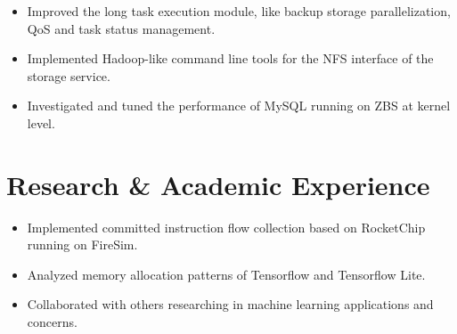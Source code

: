 \documentclass{resume}
\newcommand{\en}[1]{#1}
\newcommand{\zh}[1]{}
\begin{document}
\en{}
\zh{\datedsubsection{\textbf{\href{https://www.smartx.com/}{北京志凌海纳科技有限公司（SmartX Inc.）}}}{2019/09 -- 2020/01}}
\en{}
\zh{\role{分布式存储系统(ZBS)}{C++开发实习}}
\begin{itemize}
      \item \en{Improved the long task execution module, like backup storage parallelization, QoS and task status management.}
            \zh{改进了 ZBS 的长任务执行模块（Task Center），如支持备份存储过程批并行化、QoS 限速及任务的状态控制等。}
      \item \en{Implemented Hadoop-like command line tools for the NFS interface of the storage service.}
            \zh{为存储服务的 NFS 接口实现了一整套类似于 Hadoop HDFS 的命令行工具。}
      \item \en{Investigated and tuned the performance of MySQL running on ZBS at kernel level.}
            \zh{在内核层面调查并调优了 MySQL 运行在 ZBS 上的一些性能问题。}
\end{itemize}

\section{\en{Research \& Academic Experience}\zh{研究经历}}
\en{}
\zh{\datedsubsection{\textbf{清华大学网络大数据技术研究中心}}{2020/02 -- 2020/07}}
\en{}
\zh{\role{RISC-V 可信执行环境}{科研实习}}
\begin{itemize}
      \item \en{Implemented committed instruction flow collection based on RocketChip running on FireSim.}
            \zh{实现了 FireSim 上基于 RocketChip 的指令流收集。}
      \item \en{Analyzed memory allocation patterns of Tensorflow and Tensorflow Lite.}
            \zh{分析了 Tensorflow 与 Tensorflow Lite 框架内存分配的特征。}
\end{itemize}

\en{}
\zh{\datedsubsection{\textbf{英国剑桥大学人工智能暑期交流项目}}{2018/07 -- 2018/08}}
\en{}
\zh{\role{学生}{暑期交流}}
\begin{itemize}
      \item \en{Collaborated with others researching in machine learning applications and concerns.}
            \zh{在小组中担任领导角色，研究机器学习应用问题，负责了小组展示的选题与组织。}
\end{itemize}
\end{document}
